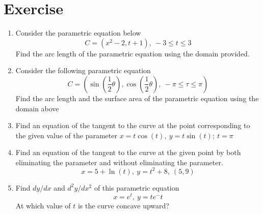 \documentclass[./MATH-115-Notes.tex]{subfiles}
\begin{document}

\newpage

\section{Exercise}
\begin{enumerate}
    \item Consider the parametric equation below
    \[C = (x^2 - 2, t + 1),\ -3 \leq t \leq 3\]
    Find the arc length of the parametric equation using the domain provided.
    \item Consider the following parametric equation \[
        C = (\sin \left( \frac{1}{2} \theta\right), \cos\left( \frac{1}{2} \theta \right),\ -\pi \leq \tau \leq \pi)
    \] Find the arc length and the surface area of the parametric equation using the domain above
    \item Find an equation of the tangent to the curve at the point corresponding to the given value of the parameter \(x = t\cos(t),\ y = t\sin(t);\ t = \pi \)
    \item Find an equation of the tangent to the curve at the given point by both eliminating the parameter and without eliminating the parameter.\[
        x = 5 + \ln(t),\ y = t^2 + 8,\ (5,9)
    \]
    \item Find $ dy/dx $ and $ d^2y/dx^2 $ of this parametric equation 
    \[
        x = e^t,\ y = te^-t
    \] At which value of $t$ is the curve concave upward?
\end{enumerate}
\end{document}
